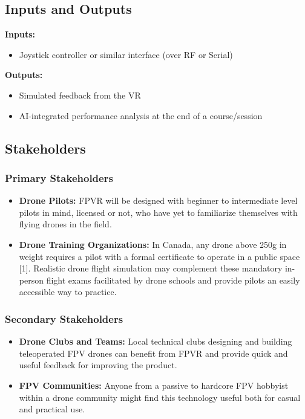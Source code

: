 \documentclass{article}
\begin{document}
\subsection{Inputs and Outputs}

\textbf{Inputs:}
\begin{itemize}
    \item Joystick controller or similar interface (over RF or Serial)
\end{itemize}
\textbf{Outputs:}
\begin{itemize}
    \item Simulated feedback from the VR
    \item AI-integrated performance analysis at the end of a course/session
\end{itemize}

\subsection{Stakeholders}
\subsubsection{Primary Stakeholders}
\begin{itemize}
    \item \textbf{Drone Pilots:} FPVR will be designed with beginner to intermediate
    level pilots in mind, licensed or not, who have yet to familiarize themselves with flying drones
    in the field.
    \item \textbf{Drone Training Organizations:} In Canada, any drone above 250g in weight
    requires a pilot with a formal certificate to operate in a public space [1]. 
    Realistic drone flight simulation may complement these
    mandatory in-person flight exams facilitated by drone schools and provide pilots an easily accessible
    way to practice.
\end{itemize}

\subsubsection{Secondary Stakeholders}
\begin{itemize}
    \item \textbf{Drone Clubs and Teams:} Local technical clubs designing and building
    teleoperated FPV drones can benefit from FPVR and provide quick and useful feedback for improving
    the product. 
    \item \textbf{FPV Communities:} Anyone from a passive to hardcore FPV hobbyist
    within a drone community might find this technology useful both for casual and practical use. 
\end{itemize}
\end{document}
